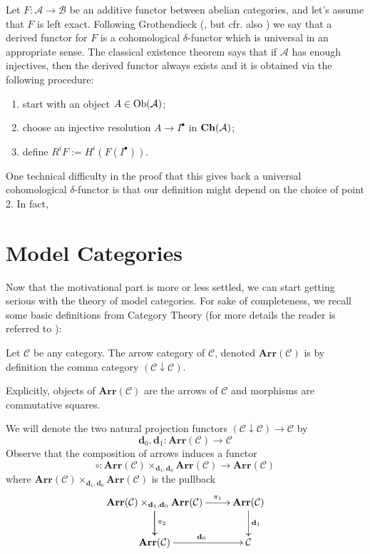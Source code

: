 Let $F \colon \mathcal A \to \mathcal B$ be an additive functor between abelian categories, and let's assume that $F$ is left exact. Following Grothendieck (\cite{tohoku}, but cfr. also \cite[Ch. II]{weibel}) we say that a derived functor for $F$ is a cohomological $\delta$-functor which is universal in an appropriate sense. The classical existence theorem says that if $\mathcal A$ has enough injectives, then the derived functor always exists and it is obtained via the following procedure:
\begin{enumerate}
\item start with an object $A \in \mathrm{Ob}(\mathcal A)$;
\item choose an injective resolution $A \to I^\bullet$ in $\mathbf{Ch}(\mathcal A)$;
\item define $R^i F := H^i(F(I^\bullet))$.
\end{enumerate}
One technical difficulty in the proof that this gives back a universal cohomological $\delta$-functor is that our definition might depend on the choice of point 2. In fact, 

\section{Model Categories}

Now that the motivational part is more or less settled, we can start getting serious with the theory of model categories. For sake of completeness, we recall some basic definitions from Category Theory (for more details the reader is referred to \cite{cwm}):

\begin{defin}
Let $\mathcal C$ be any category. The arrow category of $\mathcal C$, denoted $\mathbf{Arr}(\mathcal C)$ is by definition the comma category $(\mathcal C \downarrow \mathcal C)$.
\end{defin}

\begin{rmk}
Explicitly, objects of $\mathbf{Arr}(\mathcal C)$ are the arrows of $\mathcal C$ and morphisms are commutative squares.
\end{rmk}

\begin{rmk}
We will denote the two natural projection functors $(\mathcal C \downarrow \mathcal C) \to \mathcal C$ by
\[
\mathbf d_0, \mathbf d_1 \colon \mathbf{Arr}(\mathcal C) \to \mathcal C
\]
Observe that the composition of arrows induces a functor
\[
\circ \colon \mathbf{Arr}(\mathcal C) \times_{\mathbf d_1, \mathbf d_0} \mathbf{Arr}(\mathcal C) \to \mathbf{Arr}(\mathcal C)
\]
where $\mathbf{Arr}(\mathcal C) \times_{\mathbf d_1, \mathbf d_0} \mathbf{Arr}(\mathcal C)$ is the pullback
\[
\xymatrix{
\mathbf{Arr}(\mathcal C) \times_{\mathbf d_1, \mathbf d_0} \mathbf{Arr}(\mathcal C) \ar[d] \ar[r]^-{\pi_1} \ar[d]^{\pi_2} & \mathbf{Arr}(\mathcal C) \ar[d]^{\mathbf d_1} \\ \mathbf{Arr}(\mathcal C) \ar[r]^{\mathbf d_0} & \mathcal C
}
\]
\end{rmk}

